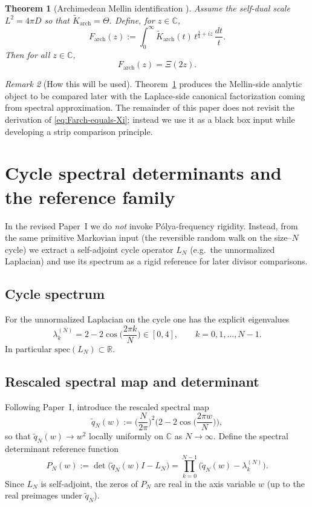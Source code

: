 \documentclass[11pt]{amsart}
\newtheorem{theorem}{Theorem}[section]
\theoremstyle{definition}
\theoremstyle{remark}
\newtheorem{remark}[theorem]{Remark}
\newcommand{\R}{\mathbb{R}}
\newcommand{\C}{\mathbb{C}}
\begin{document}
\begin{theorem}[Archimedean Mellin identification {\cite[Theorem~Z]{PaperI}}]
\label{thm:arch-mellin-identification}
Assume the self-dual scale $L^2=4\pi D$ so that $\widetilde K_{\mathrm{arch}}=\Theta$.
Define, for $z\in\C$,
\begin{equation}
\label{eq:Farch-def}
F_{\mathrm{arch}}(z)
:=
\int_0^\infty \widetilde K_{\mathrm{arch}}(t)\,t^{\frac34+iz}\,\frac{dt}{t}.
\end{equation}
Then for all $z\in\C$,
\begin{equation}
\label{eq:Farch-equals-Xi}
F_{\mathrm{arch}}(z)=\Xi(2z).
\end{equation}
\end{theorem}

\begin{remark}[How this will be used]
Theorem~\ref{thm:arch-mellin-identification} produces the Mellin-side analytic object to be compared
later with the Laplace-side canonical factorization coming from spectral approximation.  The remainder of
this paper does not revisit the derivation of \eqref{eq:Farch-equals-Xi}; instead we use it as a
black box input while developing a strip comparison principle.
\end{remark}

\section{Cycle spectral determinants and the reference family}\label{sec:spectral-ref}
In the revised Paper~I we do \emph{not} invoke P\'olya-frequency rigidity.  Instead, from the same
primitive Markovian input (the reversible random walk on the size--$N$ cycle) we extract a
self-adjoint cycle operator $L_N$ (e.g.\ the unnormalized Laplacian) and use its spectrum as a
rigid reference for later divisor comparisons.

\subsection{Cycle spectrum}
For the unnormalized Laplacian on the cycle one has the explicit eigenvalues
\[
\lambda_k^{(N)} = 2-2\cos\!\Big(\frac{2\pi k}{N}\Big)\in[0,4],\qquad k=0,1,\dots,N-1.
\]
In particular $\mathrm{spec}(L_N)\subset\R$.

\subsection{Rescaled spectral map and determinant}
Following Paper~I, introduce the rescaled spectral map
\[
\widetilde q_N(w):=\Big(\frac{N}{2\pi}\Big)^2\Big(2-2\cos\!\Big(\frac{2\pi w}{N}\Big)\Big),
\]
so that $\widetilde q_N(w)\to w^2$ locally uniformly on $\C$ as $N\to\infty$.  Define the spectral
determinant reference function
\[
P_N(w):=\det\!\big(\widetilde q_N(w)I-L_N\big)=\prod_{k=0}^{N-1}\big(\widetilde q_N(w)-\lambda_k^{(N)}\big).
\]
Since $L_N$ is self-adjoint, the zeros of $P_N$ are real in the axis variable $w$ (up to the real
preimages under $\widetilde q_N$).
\end{document}
